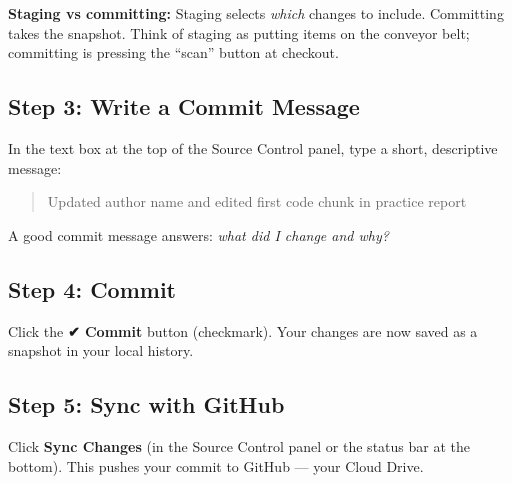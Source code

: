\documentclass[
  letterpaper,
  DIV=11,
  numbers=noendperiod,
  oneside]{scrreprt}
\begin{document}
\begin{tcolorbox}[enhanced jigsaw, title=\textcolor{quarto-callout-note-color}{\faInfo}\hspace{0.5em}{Note}, arc=.35mm, toptitle=1mm, colframe=quarto-callout-note-color-frame, toprule=.15mm, leftrule=.75mm, bottomtitle=1mm, opacityback=0, bottomrule=.15mm, coltitle=black, breakable, opacitybacktitle=0.6, titlerule=0mm, colback=white, left=2mm, colbacktitle=quarto-callout-note-color!10!white, rightrule=.15mm]

\textbf{Staging vs committing:} Staging selects \emph{which} changes to
include. Committing takes the snapshot. Think of staging as putting
items on the conveyor belt; committing is pressing the ``scan'' button
at checkout.

\end{tcolorbox}

\subsection*{Step 3: Write a Commit
Message}\label{step-3-write-a-commit-message}

In the text box at the top of the Source Control panel, type a short,
descriptive message:

\begin{quote}
Updated author name and edited first code chunk in practice report
\end{quote}

A good commit message answers: \emph{what did I change and why?}

\subsection*{Step 4: Commit}\label{step-4-commit}

Click the \textbf{✔ Commit} button (checkmark). Your changes are now
saved as a snapshot in your local history.

\subsection*{Step 5: Sync with GitHub}\label{step-5-sync-with-github}

Click \textbf{Sync Changes} (in the Source Control panel or the status
bar at the bottom). This pushes your commit to GitHub --- your Cloud
Drive.
\end{document}
